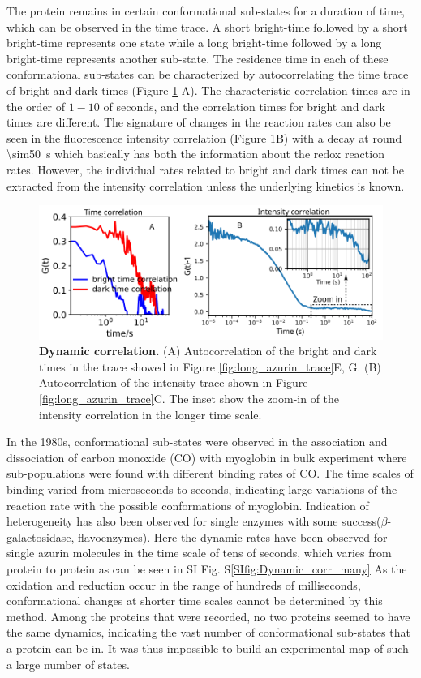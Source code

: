The protein remains in certain conformational sub-states for a duration of time, which can be observed in the time trace.
A short bright-time followed by a short bright-time represents one state while a long bright-time followed by a long bright-time represents another sub-state.
The residence time in each of these conformational sub-states can be characterized by autocorrelating the time trace of bright and dark times (Figure \ref{fig:Dynamic_corr} A).
The characteristic correlation times are in the order of $1-10$ of seconds, and the correlation times for bright and dark times are different.
The signature of changes in the reaction rates can also be seen in the fluorescence intensity correlation (Figure \ref{fig:Dynamic_corr}B) with a decay at round \SI{\sim50}{\s} which basically has both the information about the redox reaction rates.
However, the individual rates related to bright and dark times can not be extracted from the intensity correlation unless the underlying kinetics is known.
\begin{figure}
	\centering
	\includegraphics[width=\textwidth]{Dynamic_corr}
	\caption{\textbf{Dynamic correlation.} (A) Autocorrelation of the bright and dark times in the trace showed in Figure \ref{fig:long_azurin_trace}E, G. (B) Autocorrelation of the intensity trace shown in Figure \ref{fig:long_azurin_trace}C. The inset show the zoom-in of the intensity correlation in the longer time scale.}
	\label{fig:Dynamic_corr}
\end{figure}


In the 1980s, conformational sub-states were observed in the association and dissociation of carbon monoxide (CO) with myoglobin in bulk experiment where sub-populations were found with different binding rates of CO.
The time scales of binding varied from microseconds to seconds, indicating large variations of the reaction rate with the possible conformations of myoglobin.
Indication of heterogeneity has also been observed for single enzymes with some success($\beta$-galactosidase, flavoenzymes)\cite{lu1998single-molecule,kou2005single-molecule,english2006ever-fluctuating}.
Here the dynamic rates have been observed for single azurin molecules in the time scale of tens of seconds, which varies from protein to protein as can be seen in SI Fig. S\ref{SIfig:Dynamic_corr_many}
As the oxidation and reduction occur in the range of hundreds of milliseconds, conformational changes at shorter time scales cannot be determined by this method.
Among the proteins that were recorded, no two proteins seemed to have the same dynamics, indicating the vast number of conformational sub-states that a protein can be in.
It was thus impossible to build an experimental map of such a large number of states.

